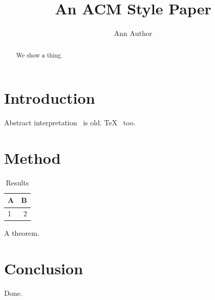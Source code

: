 \documentclass[sigconf,nonacm]{acmart}
\begin{document}
\title{An ACM Style Paper}
\author{Ann Author}
\begin{abstract}We show a thing.\end{abstract}
\maketitle
\section{Introduction}Abstract interpretation~\cite{cousot77} is old. TeX~\cite{knuth86} too.
\section{Method}\begin{table}\caption{Results}\begin{tabular}{lr}\toprule A&B\\\midrule 1&2\\\bottomrule\end{tabular}\end{table}
\begin{theorem}A theorem.\end{theorem}
\section{Conclusion}Done.

\end{document}
